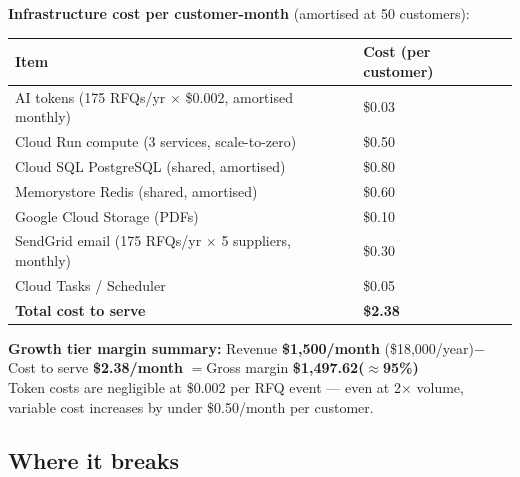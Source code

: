 \documentclass[11pt, a4paper]{article}
\begin{document}
\medskip
\textbf{Infrastructure cost per customer-month} (amortised at 50 customers):

\smallskip
\begin{center}
\begin{tabular}{L{9.5cm} R{3.8cm}}
\toprule
{}
\textbf{Item} & \textbf{Cost (per customer)} \\
\midrule
AI tokens (175 RFQs/yr $\times$ \$0.002, amortised monthly) & \$0.03 \\
Cloud Run compute (3 services, scale-to-zero)               & \$0.50 \\
Cloud SQL PostgreSQL (shared, amortised)                    & \$0.80 \\
Memorystore Redis (shared, amortised)                       & \$0.60 \\
Google Cloud Storage (PDFs)                                 & \$0.10 \\
SendGrid email (175 RFQs/yr $\times$ 5 suppliers, monthly)  & \$0.30 \\
Cloud Tasks / Scheduler                                     & \$0.05 \\
\midrule
\textbf{Total cost to serve}                                & \textbf{\$2.38} \\
\bottomrule
\end{tabular}
\end{center}

\begin{amberbox}
\textbf{Growth tier margin summary:}\quad
Revenue \textbf{\$1,500/month} ({\$18,000/year})\enspace$-$\enspace
Cost to serve \textbf{\$2.38/month}\enspace
$=$\enspace Gross margin \textbf{\$1,497.62\;($\approx$95\%)}\\[3pt]
Token costs are negligible at \$0.002 per RFQ event --- even at 2$\times$ volume,
variable cost increases by under \$0.50/month per customer.
\end{amberbox}

\subsection{Where it breaks}
\end{document}

